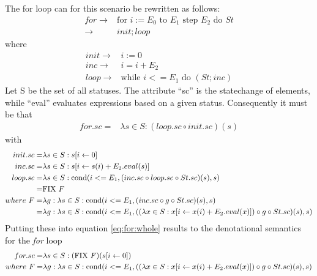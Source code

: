 % 
The for loop can for this scenario be rewritten as follows:
\begin{align}
	for	\to & \text{for } i := E_0 \text{ to } E_1 \text{ step } E_2 \text{ do } St \\
			\to & init; loop
\end{align}
where
\begin{align}
	init \to & i := 0 \\
	inc	 \to & i = i+E_2 \\
	loop \to & \text{while } i <= E_1 \text{ do } (St; inc)
\end{align}
Let S be the set of all statuses. The attribute ``sc'' is the statechange of elements, while ``eval'' evaluates expressions based on a given status. Consequently it must be that
\begin{align}
	for.sc = & \lambda s \in S: (loop.sc \circ init.sc)( s ) \label{eq:for:whole}
\end{align}
with
\begin{align}
	init.sc = & \lambda s \in S: s[i \gets 0] \\
	inc.sc 	= & \lambda s \in S: s[i \gets s( i ) + E_2.eval( s )] \\
	loop.sc = & \lambda s \in S: \text{cond}(i <= E_1, (inc.sc \circ loop.sc \circ St.sc)( s ), s) \\
					= & \text{FIX } F\\
where \ F = & \lambda g: \lambda s \in S: \text{cond}(i <= E_1, (inc.sc \circ g \circ St.sc)( s ), s) \\
					= & \lambda g: \lambda s \in S: \text{cond}(i <= E_1, ((\lambda x \in S: x[i \gets x( i ) + E_2.eval( x )]) \circ g \circ St.sc)(s), s)
\end{align}
Putting these into equation \ref{eq:for:whole} results to the denotational semantics for the \emph{for} loop
\begin{align}
	 for.sc = & \lambda s \in S: (\text{FIX } F)(s[i \gets 0]) \\
where \ F = & \lambda g: \lambda s \in S: \text{cond}(i <= E_1, ((\lambda x \in S: x[i \gets x( i ) + E_2.eval( x )]) \circ g \circ St.sc)(s), s)
\end{align}